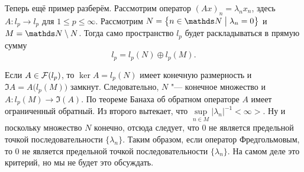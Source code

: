 Теперь ещё пример разберём. Рассмотрим оператор $(Ax)_n = \lambda_n x_n$, здесь $A\colon l_p\to l_p$ для $1\le p\le \infty$. Рассмотрим $N = \big\{n\in\N\bigm|\lambda_n=0\big\}$ и $M = \N\dd N$. Тогда само пространство $l_p$ будет раскладываться в прямую сумму
\[
  l_p = l_p(N) \oplus l_p(M).
\]

Если $A\in\mathcal F(l_p)$, то $\ker A = l_p(N)$ имеет конечную размерность и $\Im A = A\big(l_p(M)\big)$ замкнут. Следовательно, $N$ "--- конечное множество и $A\colon l_p(M)\to \Im (A)$. По теореме Банаха об обратном операторе $A$ имеет ограниченный обратный. Из второго вытекает, что $\sup\limits_{n\in M} |\lambda_n|^{-1}<\infty>$. Ну и поскольку множество $N$ конечно, отсюда следует, что $0$ не является предельной точкой последовательности $\{\lambda_n\}$.
Таким образом, если оператор Фредгольмовым, то $0$ не является предельной точкой последовательности $\{\lambda_n\}$. На самом деле это критерий, но мы не будет это обсуждать.

